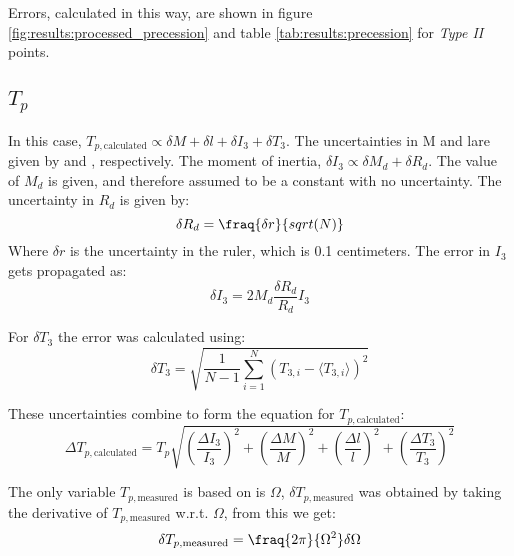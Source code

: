 \begin{multicols}{2}
Errors, calculated in this way, are shown in figure \ref{fig:results:processed_precession} and table \ref{tab:results:precession} for \emph{Type II} points.

\subsection{$T_p$}
  In this case, $T_{p, \text{calculated}} \propto \delta M + \delta l + \delta I_3 + \delta T_3$. The uncertainties in M and lare given by \label{eq:results:weight_err} and \label{eq:deltal2}, respectively. The moment of inertia, $\delta I_3 \propto \delta M_d + \delta R_d$. The value of $M_d$ is given, and therefore assumed to be a constant with no uncertainty. The uncertainty in $R_d$ is given by:
  \begin{equation*}
    \delta R_d = \fraq{\delta r}{sqrt(N)}
  \end{equation*}
Where $\delta r$ is the uncertainty in the ruler, which is 0.1 centimeters. The error in $I_3$ gets propagated as:
\begin{equation*}
  \delta I_3 = 2M_d \frac{\delta R_d}{R_d}I_3
\end{equation*}

For $\delta T_3$ the error was calculated using:
\begin{equation*}
  \delta T_3 = \sqrt{\frac{1}{N-1} \sum_{i=1}^N (T_{3, i} - ⟨T_{3, i}⟩)^2}
\end{equation*}

These uncertainties combine to form the equation for $T_{p, \text{calculated}}$:
\begin{equation*}
  \Delta T_{p,\text{calculated}} = T_p \sqrt{\left(\frac{\Delta I_3}{I_3}\right)^2 + \left(\frac{\Delta M}{M}\right)^2 + \left(\frac{\Delta l}{l}\right)^2 + \left(\frac{\Delta T_3}{T_3}\right)^2}
\end{equation*}

The only variable $T_{p, \text{measured}}$ is based on is $\Omega$, $\delta T_{p, \text{measured}}$ was obtained by taking the derivative of $T_{p, \text{measured}}$ w.r.t. $\Omega$, from this we get:
\begin{equation*}
  \delta T_{p, \text{measured}} = \fraq{2\pi}{\Omega^2}\delta \Omega
\end{equation*}

\end{multicols}
